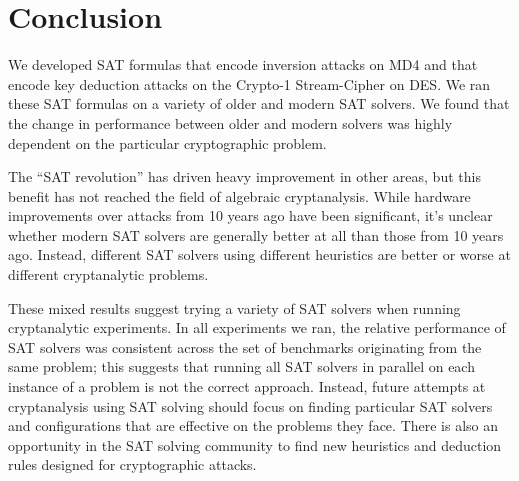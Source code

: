 \section{Conclusion}
\label{sec:conclusion}
We developed SAT formulas that encode inversion attacks on MD4 and that encode key deduction attacks on the Crypto-1 Stream-Cipher on DES. We ran these SAT formulas on a variety of older and modern SAT solvers. We found that the change in performance between older and modern solvers was highly dependent on the particular cryptographic problem.

The ``SAT revolution'' has driven heavy improvement in other areas, but this benefit has not reached the field of algebraic cryptanalysis. While hardware improvements over attacks from 10 years ago have been significant, it's unclear whether modern SAT solvers are generally better at all than those from 10 years ago. Instead, different SAT solvers using different heuristics are better or worse at different cryptanalytic problems.

These mixed results suggest trying a variety of SAT solvers when running cryptanalytic experiments. In all experiments we ran, the relative performance of SAT solvers was consistent across the set of benchmarks originating from the same problem; this suggests that running all SAT solvers in parallel on each instance of a problem is not the correct approach. Instead, future attempts at cryptanalysis using SAT solving should focus on finding particular SAT solvers and configurations that are effective on the problems they face. There is also an opportunity in the SAT solving community to find new heuristics and deduction rules designed for cryptographic attacks.